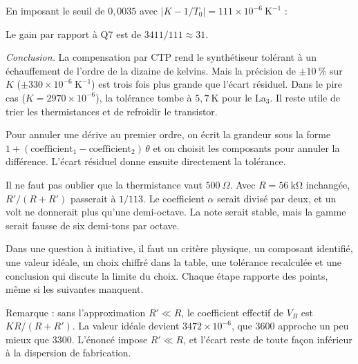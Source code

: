 \documentclass[11pt,a4paper]{article}
\newcommand{\equationajustee}[1]{%
  \sbox{\boiteequation}{$\displaystyle #1$}%
  \ifdim\wd\boiteequation>\linewidth
    \[\resizebox{\linewidth}{!}{\usebox{\boiteequation}}\]%
  \else
    \[#1\]%
  \fi}
\begin{document}
En imposant le seuil de \(0{,}0035\) avec \(|K-1/T_0|=111\times10^{-6}\ \mathrm{K^{-1}}\) :

\equationajustee{\boxed{|\Delta T|\leqslant23\ \mathrm{K}\ \text{pour le La}_3}}

\equationajustee{\boxed{|\Delta T|\leqslant9\ \mathrm{K}\ \text{pour}\ |V_{\mathrm{in},0}|=5\ \mathrm{V}}}

Le gain par rapport à Q7 est de \(3411/111\approx31\).

\emph{Conclusion.} La compensation par CTP rend le synthétiseur tolérant à un échauffement de l'ordre de la dizaine de kelvins. Mais la précision de \(\pm10\ \%\) sur \(K\) (\(\pm330\times10^{-6}\ \mathrm{K^{-1}}\)) est trois fois plus grande que l'écart résiduel. Dans le pire cas (\(K=2970\times10^{-6}\)), la tolérance tombe à \(5{,}7\ \mathrm{K}\) pour le La\(_3\). Il reste utile de trier les thermistances et de refroidir le transistor.

\begin{methode}

Pour annuler une dérive au premier ordre, on écrit la grandeur sous la forme \(1+(\text{coefficient}_1-\text{coefficient}_2)\,\theta\) et on choisit les composants pour annuler la différence. L'écart résiduel donne ensuite directement la tolérance.

\end{methode}

\begin{piege}

Il ne faut pas oublier que la thermistance vaut \(500\ \Omega\). Avec \(R=56\ \mathrm{k\Omega}\) inchangée, \(R'/(R+R')\) passerait à \(1/113\). Le coefficient \(\alpha\) serait divisé par deux, et un volt ne donnerait plus qu'une demi-octave. La note serait stable, mais la gamme serait fausse de six demi-tons par octave.

\end{piege}

\begin{jury}

Dans une question à initiative, il faut un critère physique, un composant identifié, une valeur idéale, un choix chiffré dans la table, une tolérance recalculée et une conclusion qui discute la limite du choix. Chaque étape rapporte des points, même si les suivantes manquent.

\end{jury}

Remarque : sans l'approximation \(R'\ll R\), le coefficient effectif de \(V_B\) est \(KR/(R+R')\). La valeur idéale devient \(3472\times10^{-6}\), que 3600 approche un peu mieux que 3300. L'énoncé impose \(R'\ll R\), et l'écart reste de toute façon inférieur à la dispersion de fabrication.
\end{document}

